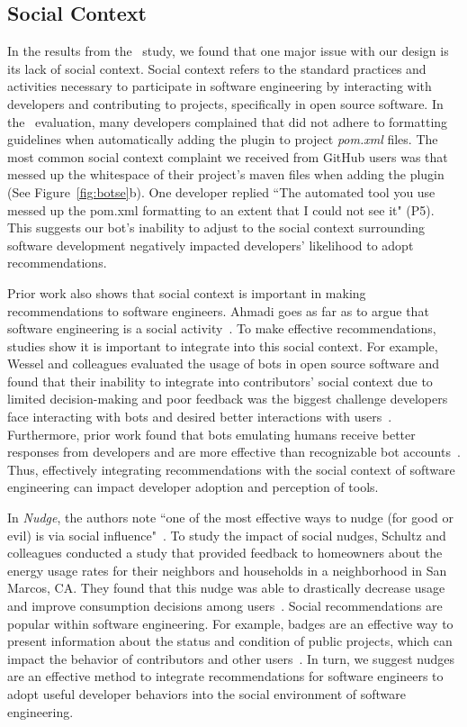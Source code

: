 \subsection{Social Context}

In the results from the \sorry~study, we found that one major issue with our \tele design is its lack of social context. Social context refers to the standard practices and activities necessary to participate in software engineering by interacting with developers and contributing to projects, specifically in open source software. In the \sorry~evaluation, many developers complained that \tool did not adhere to formatting guidelines when automatically adding the \EP plugin to project \textit{pom.xml} files. The most common social context complaint we received from GitHub users was that \tool messed up the whitespace of their project's maven \pom files when adding the \EP plugin (See Figure~\ref{fig:botse}b). One developer replied ``The automated tool you use messed up the pom.xml formatting to an extent that I could not see it" (P5). This suggests our bot's inability to adjust to the social context surrounding software development negatively impacted developers' likelihood to adopt recommendations.

Prior work also shows that social context is important in making recommendations to software engineers. Ahmadi goes as far as to argue that software engineering is a social activity~\cite{ahmadi2008survey}. To make effective recommendations, studies show it is important to integrate into this social context. For example, Wessel and colleagues evaluated the usage of bots in open source software and found that their inability to integrate into contributors' social context due to limited decision-making and poor feedback was the biggest challenge developers face interacting with bots and desired better interactions with users~\cite{wessel2018power}. Furthermore, prior work found that bots emulating humans receive better responses from developers and are more effective than recognizable bot accounts~\cite{murgia2016among}. Thus, effectively integrating recommendations with the social context of software engineering can impact developer adoption and perception of tools.

In \textit{Nudge}, the authors note ``one of the most effective ways to nudge (for good or evil) is via social influence"~\cite[p.~54]{sunstein2008nudge}. To study the impact of social nudges, Schultz and colleagues conducted a study that provided feedback to homeowners about the energy usage rates for their neighbors and households in a neighborhood in San Marcos, CA. They found that this nudge was able to drastically decrease usage and improve consumption decisions among users~\cite{schultz2007constructive}. Social recommendations are popular within software engineering. For example, badges are an effective way to present information about the status and condition of public projects, which can impact the behavior of contributors and other users~\cite{trockman2018badges}. In turn, we suggest nudges are an effective method to integrate recommendations for software engineers to adopt useful developer behaviors into the social environment of software engineering.

